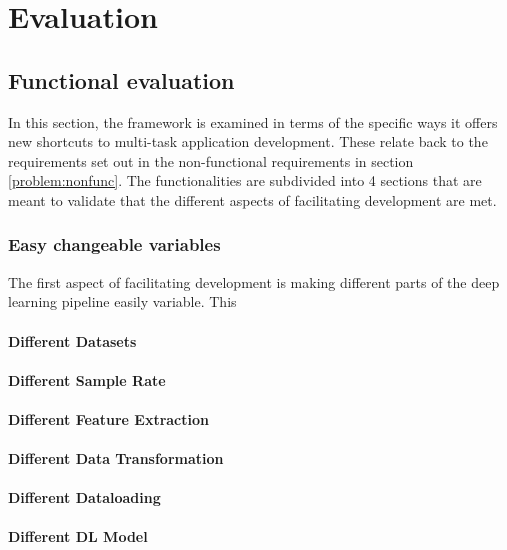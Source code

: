 \chapter{Evaluation}

\section{Functional evaluation}
In this section, the framework is examined in terms of the specific ways it offers new shortcuts to multi-task application development. These relate back to the requirements set out in the non-functional requirements in section \ref{problem:nonfunc}. The functionalities are subdivided into 4 sections that are meant to validate that the different aspects of facilitating development are met. 

\subsection{Easy changeable variables}

The first aspect of facilitating development is making different parts of the deep learning pipeline easily variable. This 

\subsubsection{Different Datasets}

\subsubsection{Different Sample Rate}

\subsubsection{Different Feature Extraction}

\subsubsection{Different Data Transformation}

\subsubsection{Different Dataloading}

\subsubsection{Different DL Model}


